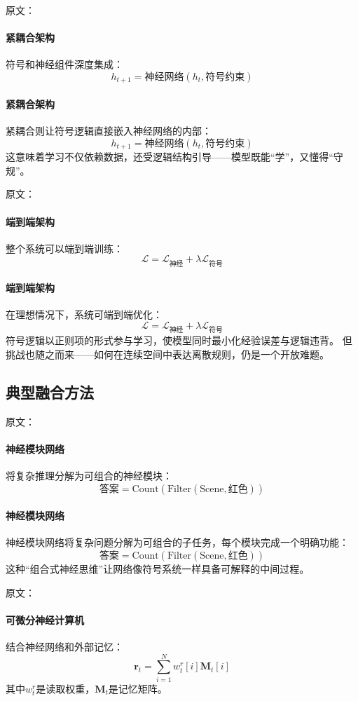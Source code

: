 原文：
\paragraph{紧耦合架构}
符号和神经组件深度集成：
$$h_{t+1} = \text{神经网络}(h_t, \text{符号约束})$$
\paragraph{紧耦合架构}
紧耦合则让符号逻辑直接嵌入神经网络的内部：  
$$h_{t+1} = \text{神经网络}(h_t, \text{符号约束})$$
这意味着学习不仅依赖数据，还受逻辑结构引导——模型既能“学”，又懂得“守规”。

原文：
\paragraph{端到端架构}
整个系统可以端到端训练：
$$\mathcal{L} = \mathcal{L}_{\text{神经}} + \lambda \mathcal{L}_{\text{符号}}$$
\paragraph{端到端架构}
在理想情况下，系统可端到端优化：  
$$\mathcal{L} = \mathcal{L}_{\text{神经}} + \lambda \mathcal{L}_{\text{符号}}$$
符号逻辑以正则项的形式参与学习，使模型同时最小化经验误差与逻辑违背。  
但挑战也随之而来——如何在连续空间中表达离散规则，仍是一个开放难题。

\subsection{典型融合方法}

原文：
\paragraph{神经模块网络}
将复杂推理分解为可组合的神经模块：
$$\text{答案} = \text{Count}(\text{Filter}(\text{Scene}, \text{红色}))$$
\paragraph{神经模块网络}
神经模块网络将复杂问题分解为可组合的子任务，每个模块完成一个明确功能：  
$$\text{答案} = \text{Count}(\text{Filter}(\text{Scene}, \text{红色}))$$
这种“组合式神经思维”让网络像符号系统一样具备可解释的中间过程。

原文：
\paragraph{可微分神经计算机}
结合神经网络和外部记忆：
$$\mathbf{r}_t = \sum_{i=1}^{N} w_t^r[i] \mathbf{M}_t[i]$$
其中$w_t^r$是读取权重，$\mathbf{M}_t$是记忆矩阵。
